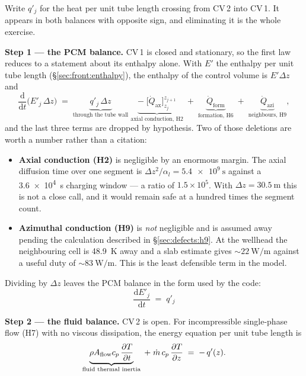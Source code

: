 \noindent
Write $q'_{j}$ for the heat per unit tube length crossing from CV\,2 into
CV\,1. It appears in both balances with opposite sign, and eliminating it is
the whole exercise.

\medskip
\noindent\textbf{Step 1 --- the PCM balance.}
CV\,1 is closed and stationary, so the first law reduces to a statement about
its enthalpy alone. With $E'$ the enthalpy per unit tube length
(\S\ref{sec:front:enthalpy}), the enthalpy of the control volume is
$E'\Delta z$ and
\begin{equation}
  \frac{\mathrm{d}}{\mathrm{d}t}\bigl(E'_{j}\,\Delta z\bigr)
  \;=\;
  \underbrace{q'_{j}\,\Delta z}_{\text{through the tube wall}}
  \;\underbrace{-\;\bigl[\dot Q_{\mathrm{ax}}\bigr]_{z_{j}}^{z_{j+1}}}
              _{\text{axial conduction, H2}}
  \;+\;\underbrace{\dot Q_{\mathrm{form}}}_{\text{formation, H6}}
  \;+\;\underbrace{\dot Q_{\mathrm{azi}}}_{\text{neighbours, H9}} ,
\end{equation}
and the last three terms are dropped by hypothesis. Two of those deletions are
worth a number rather than a citation:

\begin{itemize}[leftmargin=1.5em,itemsep=2pt]
\item \textbf{Axial conduction (H2)} is negligible by an enormous margin. The
  axial diffusion time over one segment is $\Delta z^{2}/\alpha_{l} =
  \SI{5.4e9}{\second}$ against a \SI{3.6e4}{\second} charging window --- a ratio
  of $1.5\times10^{5}$. With $\Delta z = \SI{30.5}{\meter}$ this is not a close
  call, and it would remain safe at a hundred times the segment count.
\item \textbf{Azimuthal conduction (H9)} is \emph{not} negligible and is
  assumed away pending the calculation described in \S\ref{sec:defects:h9}. At
  the wellhead the neighbouring cell is \SI{48.9}{\kelvin} away and a slab
  estimate gives $\sim\SI{22}{\watt\per\meter}$ against a useful duty of
  $\sim\SI{83}{\watt\per\meter}$. This is the least defensible term in the
  model.
\end{itemize}

\noindent
Dividing by $\Delta z$ leaves the PCM balance in the form used by the code:
\begin{equation}
  \boxed{\;\frac{\mathrm{d}E'_{j}}{\mathrm{d}t} \;=\; q'_{j}\;}
  \label{eq:pcm-balance}
\end{equation}

\medskip
\noindent\textbf{Step 2 --- the fluid balance.}
CV\,2 is open. For incompressible single-phase flow (H7) with no viscous
dissipation, the energy equation per unit tube length is
\begin{equation}
  \underbrace{\rho A_{\mathrm{flow}} c_{p}\,\frac{\partial T}{\partial t}}
             _{\text{fluid thermal inertia}}
  \;+\;
  \dot m\,c_{p}\,\frac{\partial T}{\partial z}
  \;=\;
  -\,q'(z) .
  \label{eq:fluid-pde}
\end{equation}

